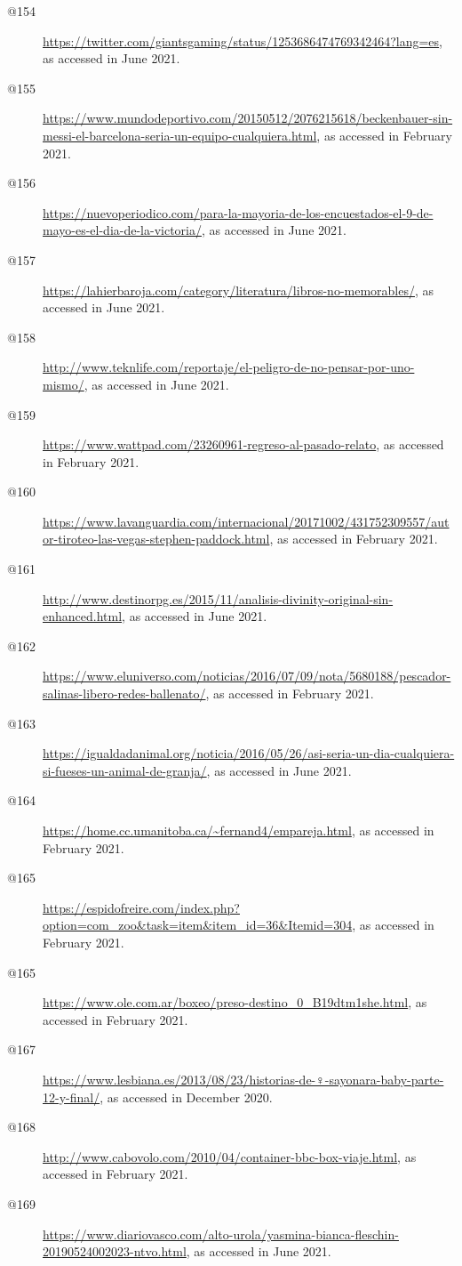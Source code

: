 \begin{flushleft}
\begin{description}
\item[@154]\url{https://twitter.com/giantsgaming/status/1253686474769342464?lang=es}, as accessed in June 2021.
\item[@155]\url{https://www.mundodeportivo.com/20150512/2076215618/beckenbauer-sin-messi-el-barcelona-seria-un-equipo-cualquiera.html}, as accessed in February 2021.
\item[@156]\url{https://nuevoperiodico.com/para-la-mayoria-de-los-encuestados-el-9-de-mayo-es-el-dia-de-la-victoria/}, as accessed in June 2021.
\item[@157]\url{https://lahierbaroja.com/category/literatura/libros-no-memorables/}, as accessed in June 2021.
\item[@158]\url{http://www.teknlife.com/reportaje/el-peligro-de-no-pensar-por-uno-mismo/}, as accessed in June 2021.
\item[@159]\url{https://www.wattpad.com/23260961-regreso-al-pasado-relato}, as accessed in February 2021.
\item[@160]\url{https://www.lavanguardia.com/internacional/20171002/431752309557/autor-tiroteo-las-vegas-stephen-paddock.html}, as accessed in February 2021.
\item[@161]\url{http://www.destinorpg.es/2015/11/analisis-divinity-original-sin-enhanced.html}, as accessed in June 2021.
\item[@162]\url{https://www.eluniverso.com/noticias/2016/07/09/nota/5680188/pescador-salinas-libero-redes-ballenato/}, as accessed in February 2021.
\item[@163]\url{https://igualdadanimal.org/noticia/2016/05/26/asi-seria-un-dia-cualquiera-si-fueses-un-animal-de-granja/}, as accessed in June 2021.
\item[@164]\url{https://home.cc.umanitoba.ca/~fernand4/empareja.html}, as accessed in February 2021.
\item[@165]\url{https://espidofreire.com/index.php?option=com_zoo&task=item&item_id=36&Itemid=304}, as accessed in February 2021.
\item[@165]\url{https://www.ole.com.ar/boxeo/preso-destino_0_B19dtm1she.html}, as accessed in February 2021.
\item[@167]\url{https://www.lesbiana.es/2013/08/23/historias-de-♀-sayonara-baby-parte-12-y-final/}, as accessed in December 2020.
\item[@168]\url{http://www.cabovolo.com/2010/04/container-bbc-box-viaje.html}, as accessed in February 2021.
\item[@169]\url{https://www.diariovasco.com/alto-urola/yasmina-bianca-fleschin-20190524002023-ntvo.html}, as accessed in June 2021.

\end{description}
\end{flushleft}
